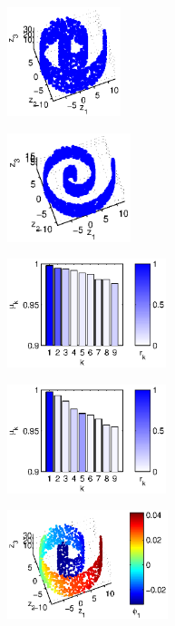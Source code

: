 \documentclass[preprint]{elsarticle}
\begin{document}
\begin{figure}[!th]
%
\begin{subfigure}{0.45\textwidth}
\centering
\includegraphics[height=1.25in]{swissroll1}
\caption{}
\label{subfig:swissroll1}
\end{subfigure}
\begin{subfigure}{0.45\textwidth}
\centering
\includegraphics[height=1.25in]{swissroll2}
\caption{}
\label{subfig:swissroll2}
\end{subfigure}
\begin{subfigure}{0.45\textwidth}
\centering
\includegraphics[height=1.25in]{swissroll1_evals}
\caption{}
\label{subfig:swissroll1_evals}
\end{subfigure}
\begin{subfigure}{0.45\textwidth}
\centering
\includegraphics[height=1.25in]{swissroll2_evals}
\caption{}
\label{subfig:swissroll2_evals}
\end{subfigure}
\begin{subfigure}{0.45\textwidth}
\centering
\includegraphics[height=1.25in]{swissroll1_color1} 

\end{subfigure}
\end{figure}
\end{document}
